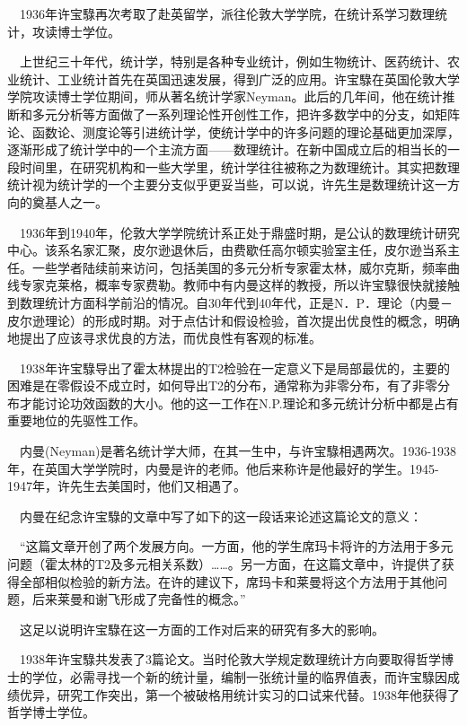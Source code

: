 \begin{frame}
	$\quad$1936年许宝騄再次考取了赴英留学，派往伦敦大学学院，在统计系学习数理统计，攻读博士学位。
	
	$\quad$上世纪三十年代，统计学，特别是各种专业统计，例如生物统计、医药统计、农业统计、工业统计首先在英国迅速发展，得到广泛的应用。许宝騄在英国伦敦大学学院攻读博士学位期间，师从著名统计学家Neyman。此后的几年间，他在统计推断和多元分析等方面做了一系列理论性开创性工作，把许多数学中的分支，如矩阵论、函数论、测度论等引进统计学，使统计学中的许多问题的理论基础更加深厚，逐渐形成了统计学中的一个主流方面——数理统计。在新中国成立后的相当长的一段时间里，在研究机构和一些大学里，统计学往往被称之为数理统计。其实把数理统计视为统计学的一个主要分支似乎更妥当些，可以说，许先生是数理统计这一方向的奠基人之一。
\end{frame}

\begin{frame}
	$\quad$1936年到1940年，伦敦大学学院统计系正处于鼎盛时期，是公认的数理统计研究中心。该系名家汇聚，皮尔逊退休后，由费歇任高尔顿实验室主任，皮尔逊当系主任。一些学者陆续前来访问，包括美国的多元分析专家霍太林，威尔克斯，频率曲线专家克莱格，概率专家费勒。教师中有内曼这样的教授，所以许宝騄很快就接触到数理统计方面科学前沿的情况。自30年代到40年代，正是N．P．理论（内曼－皮尔逊理论）的形成时期。对于点估计和假设检验，首次提出优良性的概念，明确地提出了应该寻求优良的方法，而优良性有客观的标准。

	$\quad$1938年许宝騄导出了霍太林提出的T2检验在一定意义下是局部最优的，主要的困难是在零假设不成立时，如何导出T2的分布，通常称为非零分布，有了非零分布才能讨论功效函数的大小。他的这一工作在N.P.理论和多元统计分析中都是占有重要地位的先驱性工作。
	
	$\quad$内曼(Neyman)是著名统计学大师，在其一生中，与许宝騄相遇两次。1936-1938年，在英国大学学院时，内曼是许的老师。他后来称许是他最好的学生。1945-1947年，许先生去美国时，他们又相遇了。
\end{frame}

\begin{frame}
	$\quad$内曼在纪念许宝騄的文章中写了如下的这一段话来论述这篇论文的意义： 
	
	$\quad$“这篇文章开创了两个发展方向。一方面，他的学生席玛卡将许的方法用于多元问题（霍太林的T2及多元相关系数）……。另一方面，在这篇文章中，许提供了获得全部相似检验的新方法。在许的建议下，席玛卡和莱曼将这个方法用于其他问题，后来莱曼和谢飞形成了完备性的概念。” 
	
	$\quad$这足以说明许宝騄在这一方面的工作对后来的研究有多大的影响。
	
	$\quad$1938年许宝騄共发表了3篇论文。当时伦敦大学规定数理统计方向要取得哲学博士的学位，必需寻找一个新的统计量，编制一张统计量的临界值表，而许宝騄因成绩优异，研究工作突出，第一个被破格用统计实习的口试来代替。1938年他获得了哲学博士学位。
	
\end{frame}

